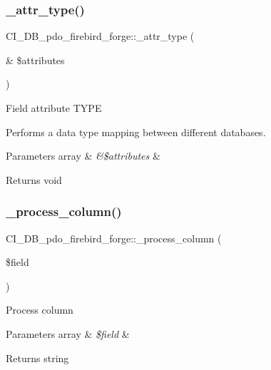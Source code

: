 \subsubsection{\texorpdfstring{\+\_\+attr\+\_\+type()}{\_attr\_type()}}
{\footnotesize\ttfamily C\+I\+\_\+\+D\+B\+\_\+pdo\+\_\+firebird\+\_\+forge\+::\+\_\+attr\+\_\+type (\begin{DoxyParamCaption}\item[{\&}]{\$attributes }\end{DoxyParamCaption})\hspace{0.3cm}{\ttfamily [protected]}}

Field attribute T\+Y\+PE

Performs a data type mapping between different databases.


\begin{DoxyParams}[1]{Parameters}
array & {\em \&\$attributes} & \\
\hline
\end{DoxyParams}
\begin{DoxyReturn}{Returns}
void 
\end{DoxyReturn}
\mbox{\label{class_c_i___d_b__pdo__firebird__forge_a951c875d7157f9d8934a79640439f87a}} 
\subsubsection{\texorpdfstring{\+\_\+process\+\_\+column()}{\_process\_column()}}
{\footnotesize\ttfamily C\+I\+\_\+\+D\+B\+\_\+pdo\+\_\+firebird\+\_\+forge\+::\+\_\+process\+\_\+column (\begin{DoxyParamCaption}\item[{}]{\$field }\end{DoxyParamCaption})\hspace{0.3cm}{\ttfamily [protected]}}

Process column


\begin{DoxyParams}[1]{Parameters}
array & {\em \$field} & \\
\hline
\end{DoxyParams}
\begin{DoxyReturn}{Returns}
string 
\end{DoxyReturn}
\mbox{\label{class_c_i___d_b__pdo__firebird__forge_a7784effa315a33db5c765af29445c531}} 
